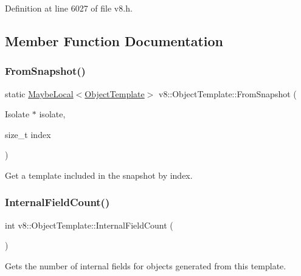Definition at line 6027 of file v8.\+h.



\subsection{Member Function Documentation}
\mbox{\label{classv8_1_1ObjectTemplate_a7899f31276e3ca69358005e360e3bc27}} 
\subsubsection{\texorpdfstring{From\+Snapshot()}{FromSnapshot()}}
{\footnotesize\ttfamily static \mbox{\hyperlink{classv8_1_1MaybeLocal}{Maybe\+Local}}$<$\mbox{\hyperlink{classv8_1_1ObjectTemplate}{Object\+Template}}$>$ v8\+::\+Object\+Template\+::\+From\+Snapshot (\begin{DoxyParamCaption}\item[{Isolate $\ast$}]{isolate,  }\item[{size\+\_\+t}]{index }\end{DoxyParamCaption})\hspace{0.3cm}{\ttfamily [static]}}

Get a template included in the snapshot by index. \mbox{\label{classv8_1_1ObjectTemplate_a43de785d594d8c01b18230b1aa79e31c}} 
\subsubsection{\texorpdfstring{Internal\+Field\+Count()}{InternalFieldCount()}}
{\footnotesize\ttfamily int v8\+::\+Object\+Template\+::\+Internal\+Field\+Count (\begin{DoxyParamCaption}{ }\end{DoxyParamCaption})}

Gets the number of internal fields for objects generated from this template. \mbox{\label{classv8_1_1ObjectTemplate_a76c12ee7be283bd3b007d062686dc0ed}} 
